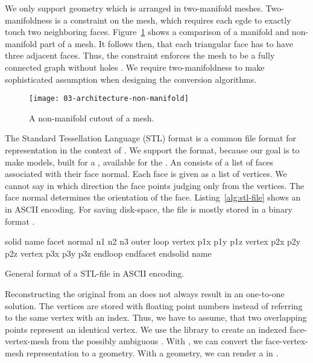 \documentclass[../03-Architecture.tex]{subfiles}
\begin{document}
We only support geometry which is arranged in two-manifold meshes.
Two-manifoldness is a constraint on the mesh, which requires each egde
to exactly touch two neighboring faces. Figure~\ref{fig:non-manifold}
shows a comparison of a manifold and non-manifold part of a mesh. It
follows then, that each triangular face has to have three adjacent
faces. Thus, the constraint enforces the mesh to be a fully connected
graph without holes \cite[p.~28]{master-thesis}. We require
two-manifoldness to make
sophisticated assumption when designing the conversion algorithms.


\begin{figure}[h]
  \centering
  \texttt{[image: 03-architecture-non-manifold]}
  \caption{A non-manifold cutout of a mesh.}
  \label{fig:non-manifold}
\end{figure}

The Standard Tessellation Language (STL) format is a common file
format for {\threedmodel} representation in the context of
{\threedprinting}. We support the {\stlfile} format, because our goal
is to make models, built for a {\threedprinter}, available for the
{\lasercutter}. An {\stlfile} consists of a list of faces associated
with their face normal. Each face is given as a list of vertices. We
cannot say in which direction the face points judging only from the
vertices. The face normal determines the orientation of the face.
Listing~\ref{alg:stl-file} shows an {\stlfile} in ASCII encoding. For
saving disk-space, the file is mostly stored in a binary format
\cite[p.~8]{stl-file}.

\begin{listing}
\centering
\begin{CVerbatim}
solid name
 facet normal n1 n2 n3
  outer loop
   vertex p1x p1y p1z
   vertex p2x p2y p2z
   vertex p3x p3y p3z
  endloop
 endfacet
endsolid name
\end{CVerbatim}
\caption{General format of a STL-file in ASCII encoding.}
\label{alg:stl-file}
\end{listing}

Reconstructing the original {\threedmodel} from an {\stlfile} does not
always result in an one-to-one solution. The vertices are stored with
floating point numbers instead of referring to the same vertex with an
index. Thus, we have to assume, that two overlapping points represent
an identical vertex. We use the library {\meshlib} to create an
indexed face-vertex-mesh from the possibly ambiguous {\stlfile}. With
{\meshlib}, we can convert the face-vertex-mesh representation to a
{\threejs} geometry. With a {\threejs} geometry, we can render a
{\threedmodel} in {\convertify}.
\end{document}
